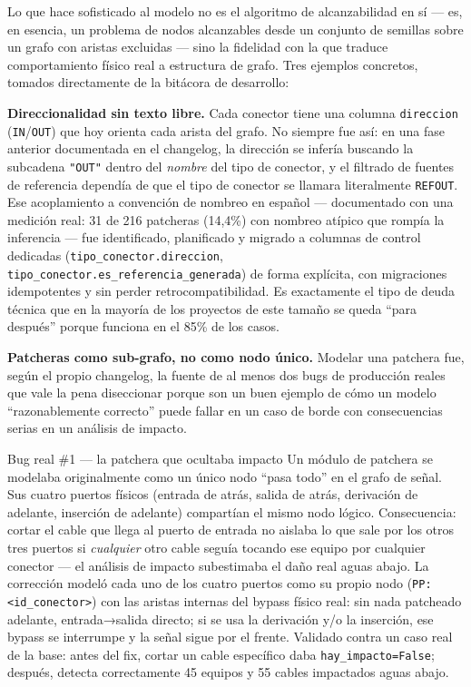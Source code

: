 \documentclass[11pt,twocolumn]{article}
\begin{document}
Lo que hace sofisticado al modelo no es el algoritmo de alcanzabilidad en sí --- es, en esencia, un problema de nodos alcanzables desde un conjunto de semillas sobre un grafo con aristas excluidas --- sino la fidelidad con la que traduce comportamiento físico real a estructura de grafo. Tres ejemplos concretos, tomados directamente de la bitácora de desarrollo:

\textbf{Direccionalidad sin texto libre.} Cada conector tiene una columna \texttt{direccion} (\texttt{IN}/\texttt{OUT}) que hoy orienta cada arista del grafo. No siempre fue así: en una fase anterior documentada en el changelog, la dirección se inferí­a buscando la subcadena \texttt{"OUT"} dentro del \emph{nombre} del tipo de conector, y el filtrado de fuentes de referencia dependía de que el tipo de conector se llamara literalmente \texttt{REFOUT}. Ese acoplamiento a convención de nombreo en español --- documentado con una medición real: 31 de 216 patcheras (14{,}4\%) con nombreo atípico que rompía la inferencia --- fue identificado, planificado y migrado a columnas de control dedicadas (\texttt{tipo\_conector.direccion}, \texttt{tipo\_conector.es\_referencia\_generada}) de forma explícita, con migraciones idempotentes y sin perder retrocompatibilidad. Es exactamente el tipo de deuda técnica que en la mayoría de los proyectos de este tamaño se queda ``para después'' porque funciona en el 85\% de los casos.

\textbf{Patcheras como sub-grafo, no como nodo único.} Modelar una patchera fue, según el propio changelog, la fuente de al menos dos bugs de producción reales que vale la pena diseccionar porque son un buen ejemplo de cómo un modelo ``razonablemente correcto'' puede fallar en un caso de borde con consecuencias serias en un análisis de impacto.

\begin{bugbox}{Bug real \#1 --- la patchera que ocultaba impacto}
Un módulo de patchera se modelaba originalmente como un único nodo ``pasa todo'' en el grafo de señal. Sus cuatro puertos físicos (entrada de atrás, salida de atrás, derivación de adelante, inserción de adelante) compartían el mismo nodo lógico. Consecuencia: cortar el cable que llega al puerto de entrada no aislaba lo que sale por los otros tres puertos si \emph{cualquier} otro cable seguía tocando ese equipo por cualquier conector --- el análisis de impacto subestimaba el daño real aguas abajo. La corrección modeló cada uno de los cuatro puertos como su propio nodo (\texttt{PP:<id\_conector>}) con las aristas internas del bypass físico real: sin nada patcheado adelante, entrada→salida directo; si se usa la derivación y/o la inserción, ese bypass se interrumpe y la señal sigue por el frente. Validado contra un caso real de la base: antes del fix, cortar un cable específico daba \texttt{hay\_impacto=False}; después, detecta correctamente 45 equipos y 55 cables impactados aguas abajo.
\end{bugbox}
\end{document}
